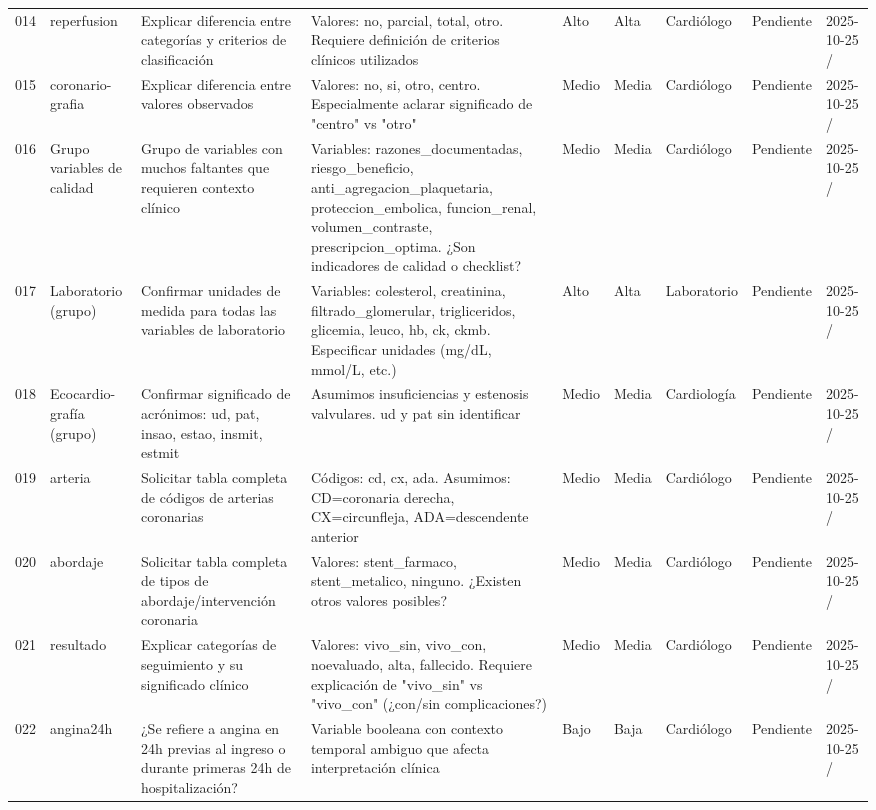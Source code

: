 \documentclass[11pt,a4paper]{article}
\begin{document}
\begin{longtable}{@{}L{0.035\textwidth} L{0.10\textwidth} L{0.265\textwidth} L{0.17\textwidth} L{0.05\textwidth} L{0.05\textwidth} L{0.095\textwidth} L{0.065\textwidth} L{0.075\textwidth}@{}}
014 & reperfusion & Explicar diferencia entre categorías y criterios de clasificación & Valores: no, parcial, total, otro. Requiere definición de criterios clínicos utilizados & Alto & Alta & Cardiólogo & Pendiente & 2025-10-25 / \\
015 & coronario-
grafia & Explicar diferencia entre valores observados & Valores: no, si, otro, centro. Especialmente aclarar significado de "centro" vs "otro" & Medio & Media & Cardiólogo & Pendiente & 2025-10-25 / \\
016 & Grupo variables de calidad & Grupo de variables con muchos faltantes que requieren contexto clínico & Variables: razones\_documentadas, riesgo\_beneficio, anti\_agregacion\_plaquetaria, proteccion\_embolica, funcion\_renal, volumen\_contraste, prescripcion\_optima. ¿Son indicadores de calidad o checklist? & Medio & Media & Cardiólogo & Pendiente & 2025-10-25 / \\
017 & Laboratorio (grupo) & Confirmar unidades de medida para todas las variables de laboratorio & Variables: colesterol, creatinina, filtrado\_glomerular, trigliceridos, glicemia, leuco, hb, ck, ckmb. Especificar unidades (mg/dL, mmol/L, etc.) & Alto & Alta & Laboratorio & Pendiente & 2025-10-25 / \\
018 & Ecocardio-
grafía (grupo) & Confirmar significado de acrónimos: ud, pat, insao, estao, insmit, estmit & Asumimos insuficiencias y estenosis valvulares. ud y pat sin identificar & Medio & Media & Cardiología & Pendiente & 2025-10-25 / \\
019 & arteria & Solicitar tabla completa de códigos de arterias coronarias & Códigos: cd, cx, ada. Asumimos: CD=coronaria derecha, CX=circunfleja, ADA=descendente anterior & Medio & Media & Cardiólogo & Pendiente & 2025-10-25 / \\
020 & abordaje & Solicitar tabla completa de tipos de abordaje/intervención coronaria & Valores: stent\_farmaco, stent\_metalico, ninguno. ¿Existen otros valores posibles? & Medio & Media & Cardiólogo & Pendiente & 2025-10-25 / \\
021 & resultado & Explicar categorías de seguimiento y su significado clínico & Valores: vivo\_sin, vivo\_con, noevaluado, alta, fallecido. Requiere explicación de "vivo\_sin" vs "vivo\_con" (¿con/sin complicaciones?) & Medio & Media & Cardiólogo & Pendiente & 2025-10-25 / \\
022 & angina24h & ¿Se refiere a angina en 24h previas al ingreso o durante primeras 24h de hospitalización? & Variable booleana con contexto temporal ambiguo que afecta interpretación clínica & Bajo & Baja & Cardiólogo & Pendiente & 2025-10-25 / \\

\end{longtable}
\end{document}
